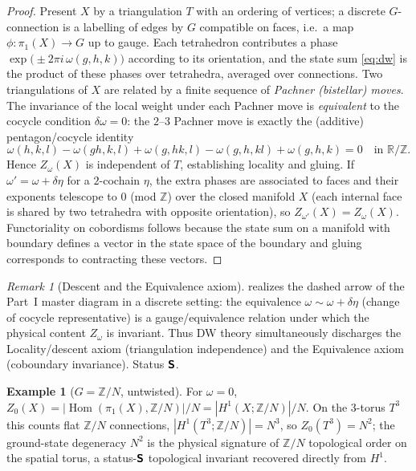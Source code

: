 \documentclass[12pt]{article}
\theoremstyle{definition}
\newtheorem{example}[example]{Example}
\theoremstyle{remark}
\newtheorem{remark}[remark]{Remark}
\newcommand{\Hom}{\operatorname{Hom}}
\newcommand{\Zm}{\mathbb{Z}}
\newcommand{\Rm}{\mathbb{R}}
\newcommand{\Sfont}{\textnormal{\sffamily\bfseries S}}
\begin{document}
\begin{proof}
Present $X$ by a triangulation $T$ with an ordering of vertices; a discrete
$G$-connection is a labelling of edges by $G$ compatible on faces, i.e.\ a map
$\phi\colon\pi_1(X)\to G$ up to gauge. Each tetrahedron contributes a phase
$\exp\!\bigl(\pm 2\pi i\,\omega(g,h,k)\bigr)$ according to its orientation, and the
state sum \eqref{eq:dw} is the product of these phases over tetrahedra, averaged
over connections. Two triangulations of $X$ are related by a finite sequence of
\emph{Pachner (bistellar) moves}. The invariance of the local weight under each
Pachner move is \emph{equivalent} to the cocycle condition $\delta\omega=0$: the
$2$--$3$ Pachner move is exactly the (additive) pentagon/cocycle identity
\[
  \omega(h,k,l)-\omega(gh,k,l)+\omega(g,hk,l)-\omega(g,h,kl)+\omega(g,h,k)=0
  \quad\text{in }\Rm/\Zm .
\]
Hence $Z_\omega(X)$ is independent of $T$, establishing locality and gluing. If
$\omega'=\omega+\delta\eta$ for a $2$-cochain $\eta$, the extra phases are
associated to faces and their exponents telescope to $0$ (mod $\Zm$) over the
closed manifold $X$ (each internal face is shared by two tetrahedra with opposite
orientation), so $Z_{\omega'}(X)=Z_\omega(X)$. Functoriality on cobordisms follows
because the
state sum on a manifold with boundary defines a vector in the state space of the
boundary and gluing corresponds to contracting these vectors.
\end{proof}

\begin{remark}[Descent and the Equivalence axiom]
\label{rem:dw-equiv}
 realizes the dashed arrow of the Part~I master diagram in a discrete
setting: the equivalence $\omega\sim\omega+\delta\eta$ (change of cocycle
representative) is a gauge/equivalence relation under which the physical content
$Z_\omega$ is invariant. Thus DW theory simultaneously discharges the
Locality/descent axiom (triangulation independence) and the Equivalence axiom
(coboundary invariance). Status $\Sfont$.
\end{remark}

\begin{example}[$G=\Zm/N$, untwisted]
\label{ex:zn-dw}
For $\omega=0$, $Z_0(X)=|\Hom(\pi_1(X),\Zm/N)|/N=|H^1(X;\Zm/N)|/N$. On the
$3$-torus $T^3$ this counts flat $\Zm/N$ connections, $|H^1(T^3;\Zm/N)|=N^3$, so
$Z_0(T^3)=N^2$; the ground-state degeneracy $N^2$ is the physical signature of
$\Zm/N$ topological order on the spatial torus, a status-$\Sfont$ topological
invariant recovered directly from $H^1$.
\end{example}
\end{document}
